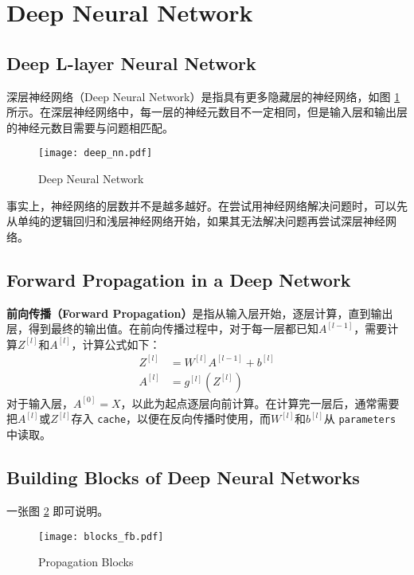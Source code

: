 \section{Deep Neural Network}

\subsection{Deep L-layer Neural Network}
深层神经网络（Deep Neural Network）是指具有更多隐藏层的神经网络，如图 \ref{fig:deep_nn} 所示。在深层神经网络中，每一层的神经元数目不一定相同，但是输入层和输出层的神经元数目需要与问题相匹配。
\begin{figure}[h!bt]
    \centering
    \texttt{[image: deep\_nn.pdf]}
    \caption[Deep Neural Network]{Deep Neural Network\setcounter{footnote}{0}\footnotemark}
    \label{fig:deep_nn}
\end{figure}

事实上，神经网络的层数并不是越多越好。在尝试用神经网络解决问题时，可以先从单纯的逻辑回归和浅层神经网络开始，如果其无法解决问题再尝试深层神经网络。

\subsection{Forward Propagation in a Deep Network}
\textbf{前向传播（Forward Propagation）}是指从输入层开始，逐层计算，直到输出层，得到最终的输出值。在前向传播过程中，对于每一层都已知$A^{[l-1]}$，需要计算$Z^{[l]}$和$A^{[l]}$，计算公式如下：
\begin{align}
    Z^{[l]} &= W^{[l]} A^{[l-1]} + b^{[l]} \\
    A^{[l]} &= g^{[l]}(Z^{[l]})
\end{align}
对于输入层，$A^{[0]} = X$，以此为起点逐层向前计算。在计算完一层后，通常需要把$A^{[l]}$或$Z^{[l]}$存入 \verb|cache|，以便在反向传播时使用，而$W^{[l]}$和$b^{[l]}$从 \verb|parameters| 中读取。

\subsection{Building Blocks of Deep Neural Networks}
一张图 \ref{fig:blocks_fb} 即可说明。
\begin{figure}[htb!]
    \centering
    \texttt{[image: blocks\_fb.pdf]}
    \caption{Propagation Blocks}
    \label{fig:blocks_fb}
\end{figure}


